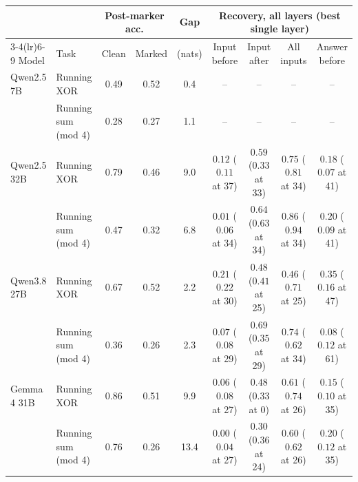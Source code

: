 \begin{tabular}{ll cc c cccc}
\toprule
& & \multicolumn{2}{c}{Post-marker acc.} & Gap & \multicolumn{4}{c}{Recovery, all layers (best single layer)} \\
\cmidrule(lr){3-4}\cmidrule(lr){6-9}
Model & Task & Clean & Marked & (nats) & Input before & Input after & All inputs & Answer before \\
\midrule
Qwen2.5 7B & Running XOR & 0.49 & 0.52 & 0.4 & -- & -- & -- & -- \\
 & Running sum (mod 4) & 0.28 & 0.27 & 1.1 & -- & -- & -- & -- \\
Qwen2.5 32B & Running XOR & 0.79 & 0.46 & 9.0 & $0.12$ ($0.11$ at 37) & $\mathbf{0.59}$ ($0.33$ at 33) & $\mathbf{0.75}$ ($0.81$ at 34) & $0.18$ ($0.07$ at 41) \\
 & Running sum (mod 4) & 0.47 & 0.32 & 6.8 & $0.01$ ($0.06$ at 34) & $\mathbf{0.64}$ ($0.63$ at 34) & $\mathbf{0.86}$ ($0.94$ at 34) & $0.20$ ($0.09$ at 41) \\
Qwen3.8 27B & Running XOR & 0.67 & 0.52 & 2.2 & $0.21$ ($0.22$ at 30) & $0.48$ ($0.41$ at 25) & $0.46$ ($0.71$ at 25) & $0.35$ ($0.16$ at 47) \\
 & Running sum (mod 4) & 0.36 & 0.26 & 2.3 & $0.07$ ($0.08$ at 29) & $\mathbf{0.69}$ ($0.35$ at 29) & $\mathbf{0.74}$ ($0.62$ at 34) & $0.08$ ($0.12$ at 61) \\
Gemma 4 31B & Running XOR & 0.86 & 0.51 & 9.9 & $0.06$ ($0.08$ at 27) & $0.48$ ($0.33$ at 0) & $\mathbf{0.61}$ ($0.74$ at 26) & $0.15$ ($0.10$ at 35) \\
 & Running sum (mod 4) & 0.76 & 0.26 & 13.4 & 0.00 ($0.04$ at 27) & $0.30$ ($0.36$ at 24) & $\mathbf{0.60}$ ($0.62$ at 26) & $0.20$ ($0.12$ at 35) \\
\bottomrule
\end{tabular}
